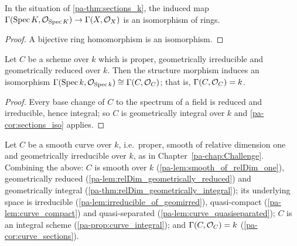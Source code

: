 \begin{corollary}
  \label{pa-cor:sections_iso}
  \leanok

  In the situation of \ref{pa-thm:sections_k}, the induced map
  \(\Gamma(\operatorname{Spec} K, \mathcal{O}_{\operatorname{Spec} K}) \to \Gamma(X, \mathcal{O}_{X})\) is an isomorphism of rings.
\end{corollary}
\begin{proof}
  \leanok
  A bijective ring homomorphism is an isomorphism.
\end{proof}

\begin{corollary}
  \label{pa-cor:curve_sections}
  \leanok

  Let \(C\) be a scheme over \(k\) which is proper, geometrically irreducible and
  geometrically reduced over \(k\). Then the structure morphism induces an isomorphism
  \(\Gamma(\operatorname{Spec} k, \mathcal{O}_{\operatorname{Spec} k}) \cong \Gamma(C, \mathcal{O}_{C})\); that is,
  \(\Gamma(C, \mathcal{O}_{C}) = k\).
\end{corollary}
\begin{proof}
  \leanok
  Every base change of \(C\) to the spectrum of a field is reduced and irreducible, hence
  integral; so \(C\) is geometrically integral over \(k\) and \ref{pa-cor:sections_iso} applies.
\end{proof}

\begin{remark}
  \label{pa-rem:curve_bundle}
  Let \(C\) be a smooth curve over \(k\), i.e.\ proper, smooth of relative dimension one and
  geometrically irreducible over \(k\), as in Chapter~\ref{pa-chap:Challenge}. Combining the
  above: \(C\) is smooth over \(k\) (\ref{pa-lem:smooth_of_relDim_one}), geometrically reduced
  (\ref{pa-lem:relDim_geometrically_reduced}) and geometrically integral
  (\ref{pa-thm:relDim_geometrically_integral}); its underlying space is irreducible
  (\ref{pa-lem:irreducible_of_geomirred}), quasi-compact (\ref{pa-lem:curve_compact}) and
  quasi-separated (\ref{pa-lem:curve_quasiseparated}); \(C\) is an integral scheme
  (\ref{pa-prop:curve_integral}); and \(\Gamma(C, \mathcal{O}_{C}) = k\) (\ref{pa-cor:curve_sections}).
\end{remark}

